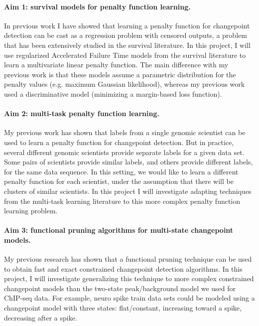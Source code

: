 \documentclass{article}
\begin{document}
\paragraph{Aim 1: survival models for penalty function learning.} In
previous work I have showed that learning a penalty function for
changepoint detection can be cast as a regression problem with
censored outputs, a problem that has been extensively studied in the
survival literature. In this project, I will use regularized Accelerated Failure
Time models from the survival literature to learn a multivariate
linear penalty function. The main difference with my previous work is
that these models assume a parametric distribution for the penalty values
(e.g. maximum Gaussian likelihood), whereas my previous
work used a discriminative model (minimizing a margin-based loss
function).

\paragraph{Aim 2: multi-task penalty function learning.} My previous
work has shown that labels from a single genomic scientist can be used
to learn a penalty function for changepoint detection. But in
practice, several different genomic scientists provide separate
labels for a given data set. Some pairs of scientists provide similar
labels, and others provide different labels, for the same data
sequence. In this setting, we would like to learn a different penalty
function for each scientist, under the assumption that there will be
clusters of similar scientists. In this project I will investigate
adapting techniques from the multi-task learning literature to this
more complex penalty function learning problem.


\paragraph{Aim 3: functional pruning algorithms for multi-state
  changepoint models.} My previous research has shown that a
functional pruning technique can be used to obtain fast and exact
constrained changepoint detection algorithms. In this project, I will
investigate generalizing this technique to more complex constrained
changepoint models than the two-state peak/background model we used
for ChIP-seq data. For example, neuro spike train data sets could be
modeled using a changepoint model with three states: flat/constant,
increasing toward a spike, decreasing after a spike.
\end{document}
